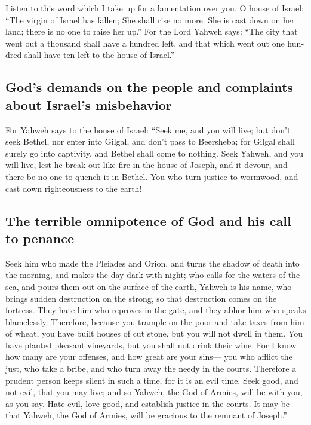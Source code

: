 \begin{paracol}{2}
\begin{otherlanguage}{english}
 Listen to this word which I take up for a lamentation
over you, O house of Israel:  ``The virgin of Israel has
fallen; She shall rise no more. She is cast down on her land; there is
no one to raise her up.''  For the Lord Yahweh says: ``The
city that went out a thousand shall have a hundred left, and that which
went out one hundred shall have ten left to the house of Israel.''

\hypertarget{gods-demands-on-the-people-and-complaints-about-israels-misbehavior}{%
\subsection{God's demands on the people and complaints about Israel's
misbehavior}\label{gods-demands-on-the-people-and-complaints-about-israels-misbehavior}}

 For Yahweh says to the house of Israel: ``Seek me, and
you will live;  but don't seek Bethel, nor enter into
Gilgal, and don't pass to Beersheba; for Gilgal shall surely go into
captivity, and Bethel shall come to nothing.  Seek Yahweh,
and you will live, lest he break out like fire in the house of Joseph,
and it devour, and there be no one to quench it in Bethel.
 You who turn justice to wormwood, and cast down
righteousness to the earth!

\hypertarget{the-terrible-omnipotence-of-god-and-his-call-to-penance}{%
\subsection{The terrible omnipotence of God and his call to
penance}\label{the-terrible-omnipotence-of-god-and-his-call-to-penance}}

 Seek him who made the Pleiades and Orion, and turns the
shadow of death into the morning, and makes the day dark with night; who
calls for the waters of the sea, and pours them out on the surface of
the earth, Yahweh is his name,  who brings sudden
destruction on the strong, so that destruction comes on the fortress.
 They hate him who reproves in the gate, and they abhor
him who speaks blamelessly.  Therefore, because you
trample on the poor and take taxes from him of wheat, you have built
houses of cut stone, but you will not dwell in them. You have planted
pleasant vineyards, but you shall not drink their wine. 
For I know how many are your offenses, and how great are your sins---
you who afflict the just, who take a bribe, and who turn away the needy
in the courts.  Therefore a prudent person keeps silent
in such a time, for it is an evil time.  Seek good, and
not evil, that you may live; and so Yahweh, the God of Armies, will be
with you, as you say.  Hate evil, love good, and
establish justice in the courts. It may be that Yahweh, the God of
Armies, will be gracious to the remnant of Joseph.''


\end{otherlanguage}
\end{paracol}
